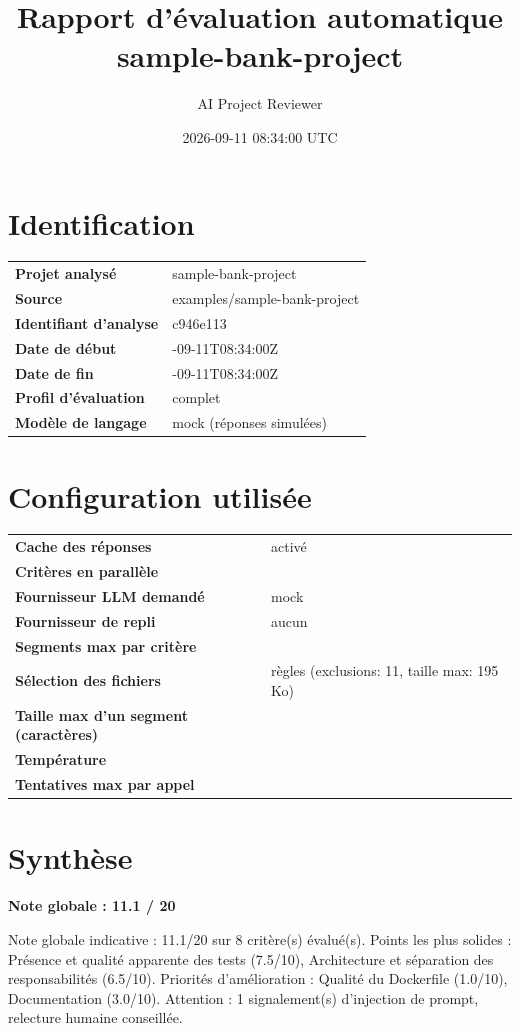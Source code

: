\documentclass[11pt,a4paper]{article}
\title{Rapport d'évaluation automatique\\\large sample-bank-project}
\author{AI Project Reviewer}
\date{2026-09-11 08:34:00 UTC}
\begin{document}
\maketitle
\tableofcontents
\newpage
\section{Identification}
\begin{tabularx}{\textwidth}{@{}>{\raggedright\bfseries}p{5.6cm}>{\raggedright\arraybackslash}X@{}}
\toprule
Projet analysé & sample-bank-project \\
Source & examples/\allowbreak{}sample-bank-project \\
Identifiant d'analyse & c946e113 \\
Date de début & 2026-09-11T08:34:00Z \\
Date de fin & 2026-09-11T08:34:00Z \\
Profil d'évaluation & complet \\
Modèle de langage & mock (réponses simulées) \\
\bottomrule
\end{tabularx}

\section{Configuration utilisée}
\begin{tabularx}{\textwidth}{@{}>{\raggedright\bfseries}p{5.6cm}>{\raggedright\arraybackslash}X@{}}
\toprule
Cache des réponses & activé \\
Critères en parallèle & 1 \\
Fournisseur LLM demandé & mock \\
Fournisseur de repli & aucun \\
Segments max par critère & 4 \\
Sélection des fichiers & règles (exclusions: 11, taille max: 195 Ko) \\
Taille max d'un segment (caractères) & 12000 \\
Température & 0.0 \\
Tentatives max par appel & 3 \\
\bottomrule
\end{tabularx}

\section{Synthèse}
\begin{center}\Large\textbf{Note globale : 11.1 /\allowbreak{} 20}\end{center}
Note globale indicative : 11.1/\allowbreak{}20 sur 8 critère(s) évalué(s). Points les plus solides : Présence et qualité apparente des tests (7.5/\allowbreak{}10), Architecture et séparation des responsabilités (6.5/\allowbreak{}10). Priorités d'amélioration : Qualité du Dockerfile (1.0/\allowbreak{}10), Documentation (3.0/\allowbreak{}10). Attention : 1 signalement(s) d'injection de prompt, relecture humaine conseillée.
\end{document}
